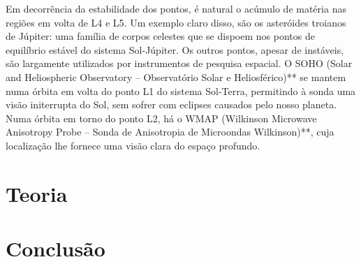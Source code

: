 \documentclass[10pt,twoside,a4paper,brazil]{abntex2}
\begin{document}
   Em decorrência da estabilidade dos pontos, é natural o acúmulo de matéria nas regiões em volta de L4 e L5. Um exemplo claro disso, são os asteróides troianos de Júpiter: uma família de corpos celestes que se dispoem nos pontos de equilíbrio estável do sistema Sol-Júpiter. Os outros pontos, apesar de instáveis, são largamente utilizados por instrumentos de pesquisa espacial. O SOHO (Solar and Heliospheric Observatory -- Observatório Solar e Heliosférico)** se mantem numa órbita em volta do ponto L1 do sistema Sol-Terra, permitindo à sonda uma visão initerrupta do Sol, sem sofrer com eclipses causados pelo nosso planeta. Numa órbita em torno do ponto L2, há o WMAP (Wilkinson Microwave Anisotropy Probe -- Sonda de Anisotropia de Microondas Wilkinson)**, cuja localização lhe fornece uma visão clara do espaço profundo.
      
    \chapter{Teoria}
      

   \chapter{Conclusão}
      

   
\end{document}
